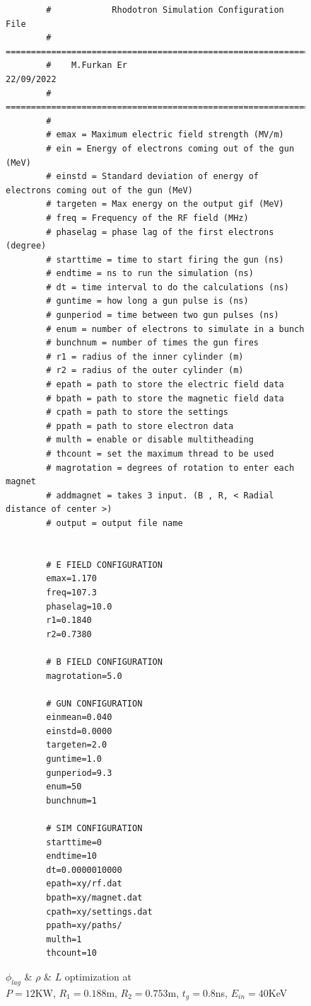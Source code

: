 \documentclass[a4paper,oneside,12pt]{report}
\numberwithin{equation}{chapter}
\begin{document}
\begin{figure}[H]
    \centering
    \captionsetup{justification=centering}
    \begin{verbatim}
        #            Rhodotron Simulation Configuration File
        # ================================================================
        #    M.Furkan Er                                     22/09/2022   
        # ================================================================
        #
        # emax = Maximum electric field strength (MV/m)
        # ein = Energy of electrons coming out of the gun (MeV)
        # einstd = Standard deviation of energy of electrons coming out of the gun (MeV)
        # targeten = Max energy on the output gif (MeV)
        # freq = Frequency of the RF field (MHz)
        # phaselag = phase lag of the first electrons (degree)
        # starttime = time to start firing the gun (ns)
        # endtime = ns to run the simulation (ns)
        # dt = time interval to do the calculations (ns)
        # guntime = how long a gun pulse is (ns)
        # gunperiod = time between two gun pulses (ns)
        # enum = number of electrons to simulate in a bunch
        # bunchnum = number of times the gun fires
        # r1 = radius of the inner cylinder (m)
        # r2 = radius of the outer cylinder (m)
        # epath = path to store the electric field data
        # bpath = path to store the magnetic field data
        # cpath = path to store the settings
        # ppath = path to store electron data
        # multh = enable or disable multitheading
        # thcount = set the maximum thread to be used
        # magrotation = degrees of rotation to enter each magnet 
        # addmagnet = takes 3 input. (B , R, < Radial distance of center >)
        # output = output file name 
        
        
        # E FIELD CONFIGURATION 
        emax=1.170
        freq=107.3
        phaselag=10.0
        r1=0.1840
        r2=0.7380
        
        # B FIELD CONFIGURATION 
        magrotation=5.0
        
        # GUN CONFIGURATION 
        einmean=0.040
        einstd=0.0000
        targeten=2.0
        guntime=1.0
        gunperiod=9.3
        enum=50
        bunchnum=1
        
        # SIM CONFIGURATION 
        starttime=0
        endtime=10
        dt=0.0000010000
        epath=xy/rf.dat
        bpath=xy/magnet.dat
        cpath=xy/settings.dat
        ppath=xy/paths/
        multh=1
        thcount=10     
    \end{verbatim}
\caption{$\phi_{lag}$ \& $\rho$ \& $L$ optimization at \\$P=12$KW, $R_1=0.188$m, $R_2=0.753$m, $t_g=0.8$ns, $E_{in}=40$KeV}
\label{fig:config_file}
\end{figure}
\end{document}
